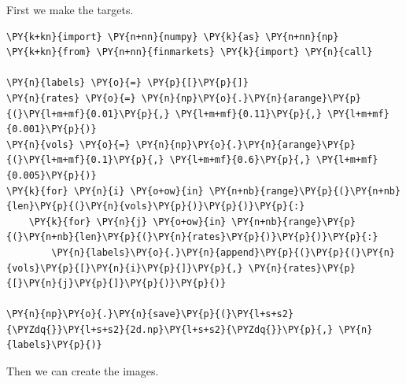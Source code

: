 First we make the targets.

\begin{tcolorbox}[breakable, size=fbox, boxrule=1pt, pad at break*=1mm,colback=cellbackground, colframe=cellborder]
\begin{Verbatim}[commandchars=\\\{\}]
\PY{k+kn}{import} \PY{n+nn}{numpy} \PY{k}{as} \PY{n+nn}{np}
\PY{k+kn}{from} \PY{n+nn}{finmarkets} \PY{k}{import} \PY{n}{call}
	
\PY{n}{labels} \PY{o}{=} \PY{p}{[}\PY{p}{]}
\PY{n}{rates} \PY{o}{=} \PY{n}{np}\PY{o}{.}\PY{n}{arange}\PY{p}{(}\PY{l+m+mf}{0.01}\PY{p}{,} \PY{l+m+mf}{0.11}\PY{p}{,} \PY{l+m+mf}{0.001}\PY{p}{)}
\PY{n}{vols} \PY{o}{=} \PY{n}{np}\PY{o}{.}\PY{n}{arange}\PY{p}{(}\PY{l+m+mf}{0.1}\PY{p}{,} \PY{l+m+mf}{0.6}\PY{p}{,} \PY{l+m+mf}{0.005}\PY{p}{)}
\PY{k}{for} \PY{n}{i} \PY{o+ow}{in} \PY{n+nb}{range}\PY{p}{(}\PY{n+nb}{len}\PY{p}{(}\PY{n}{vols}\PY{p}{)}\PY{p}{)}\PY{p}{:}
    \PY{k}{for} \PY{n}{j} \PY{o+ow}{in} \PY{n+nb}{range}\PY{p}{(}\PY{n+nb}{len}\PY{p}{(}\PY{n}{rates}\PY{p}{)}\PY{p}{)}\PY{p}{:}
        \PY{n}{labels}\PY{o}{.}\PY{n}{append}\PY{p}{(}\PY{p}{(}\PY{n}{vols}\PY{p}{[}\PY{n}{i}\PY{p}{]}\PY{p}{,} \PY{n}{rates}\PY{p}{[}\PY{n}{j}\PY{p}{]}\PY{p}{)}\PY{p}{)} 
	
\PY{n}{np}\PY{o}{.}\PY{n}{save}\PY{p}{(}\PY{l+s+s2}{\PYZdq{}}\PY{l+s+s2}{2d.np}\PY{l+s+s2}{\PYZdq{}}\PY{p}{,} \PY{n}{labels}\PY{p}{)}
\end{Verbatim}
\end{tcolorbox}

Then we can create the images.


